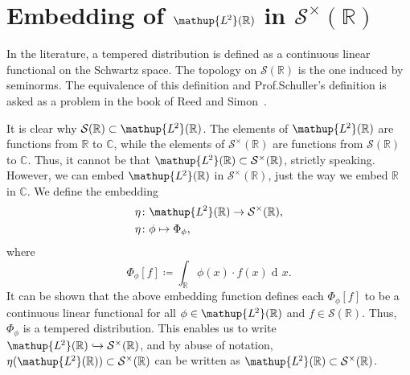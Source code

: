 \documentclass[12pt, a4 paper]{article}
\theoremstyle{definition}
\newcommand{\ltwo}{\mathup{L\kern-0.5pt^2}}
\newcommand{\rr}{\mathbb{R}}
\newcommand{\cc}{\mathbb{C}}
\newcommand{\nn}{\mathbb{N}_0}
\newcommand{\ltwor}{\ltwo(\rr)}
\newcommand{\schwartz}{\mathcal{S}}
\newcommand{\schwartzr}{\schwartz(\rr)}
\newcommand{\dist}{\schwartz^\times}
\newcommand{\distr}{\dist(\rr)}
\newcommand{\der}{\operatorname{d\!}{}}
\begin{document}
	\section{Embedding of \texorpdfstring{\(\ltwor\)}{L²(ℝ)} in \texorpdfstring{\(\distr\)}{𝒮⁺(ℝ)}}

	In the literature, a tempered distribution is defined as a continuous linear functional on the Schwartz space. The topology on $\schwartzr$ is the one induced by seminorms. The equivalence of this definition and Prof.\@ Schuller's definition is asked as a problem in the book of Reed and Simon~\cite[prob.~24, chp.~5, p.~176]{Reed}.

	It is clear why $\schwartzr \subset \ltwor$. The elements of $\ltwor$ are functions from $\rr$ to $\cc$, while the elements of $\distr$ are functions from $\schwartzr$ to $\cc$. Thus, it cannot be that $\ltwor \subset \distr$, strictly speaking. However, we can embed $\ltwor$ in $\distr$, just the way we embed $\rr$ in $\cc$.
	We define the embedding
	\begin{align*}
		\eta &\colon \ltwor \rightarrow \distr,\\
		\eta &\colon \phi \mapsto \Phi_\phi,
	\end{align*}
	where
	\[
	\Phi_\phi [f] \coloneq \int_{\rr} \phi(x) \cdot f(x) \der x.
	\]
	It can be shown that the above embedding function defines each $\Phi_\phi[f]$ to be a continuous linear functional for all $\phi \in \ltwor$ and $f \in \schwartzr$. Thus, $\Phi_\phi$ is a tempered distribution. This enables us to write $\ltwor \xhookrightarrow{} \distr$, and by abuse of notation, $\eta (\ltwor) \subset \distr$ can be written as $\ltwor \subset \distr$.
\end{document}
